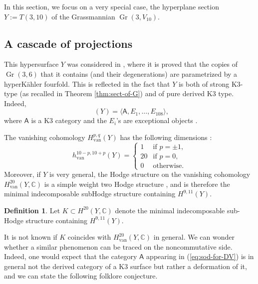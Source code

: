 \documentclass[JEP,XML,SOM,Unicode,NoEqCountersInSection]{cedram}
\newcommand{\van}{\mathrm{van}}
\theoremstyle{plain}
\theoremstyle{definition}
\newtheorem{defin}[theorem]{Definition}
\newcommand{\cat}[1]{\mathsf{#1}}
\newcommand{\sod}[1]{\langle #1 \rangle}
\DeclareMathOperator{\Db}{{\cat{D}^{\mathrm{b}}}}
\DeclareMathOperator{\Gr}{Gr}
\newcommand{\CC}{\mathbb{C}}
\begin{document}
In this section, we focus on a very special case, the hyperplane section $Y:=T(3,10)$ of
the Grassmannian $\Gr(3,V_{10})$.

\subsection{A cascade of projections}
This hypersurface $Y$ was considered in \cite{debarre-voisin}, where it is proved that the copies
of $\Gr(3,6)$ that it contains (and their degenerations) are parametrized by a hyperKähler fourfold.
This is reflected in the fact that $Y$ is both of strong
K3-type (as recalled in Theorem \ref{thm:sect-of-G}) and of pure derived K3 type. Indeed,\vspace*{-3pt}
\begin{equation}\label{eq:sod-for-DV}
\Db(Y)= \sod{\cat{A},E_1,\ldots,E_{108}},
\end{equation}
where $\cat{A}$ is a K3 category and the $E_i$'s are exceptional objects \cite{kuz-fractional}.

The vanishing cohomology $H^{p,q}_{\van}(Y)$
has the following dimensions \cite{debarre-voisin}:\vspace*{-3pt}\enlargethispage{.5\baselineskip}%
\begin{equation*}\label{eq:Hodge-for-DV}
h_{\van}^{10-p,10+p}(Y) = \begin{cases}
1 & \text{if } p=\pm 1, \\
20 & \text{if } p=0,\\
0 & \text{otherwise.}
\end{cases}
\end{equation*}
Moreover, if $Y$ is very general, the Hodge structure on the vanishing cohomology $H^{20}_{\van}(Y,\CC)$ is a simple weight two Hodge structure \cite[Th.\,2.2]{debarre-voisin},
and is therefore the minimal indecomposable subHodge structure containing $H^{9,11}(Y)$.

\begin{defin}
Let $K \subset H^{20}(Y,\CC)$ denote the minimal indecomposable sub-Hodge structure containing $H^{9,11}(Y)$.
\end{defin}

It is not known if $K$ coincides with $H^{20}_{\van}(Y,\CC)$ in general. We can wonder whether a similar
phenomenon can be traced on the noncommutative side. Indeed, one would expect that the category $\cat{A}$ appearing in (\ref{eq:sod-for-DV})
is in general not the derived category of a K3 surface but rather
a deformation of it, and we can state the following folklore conjecture.
\end{document}
